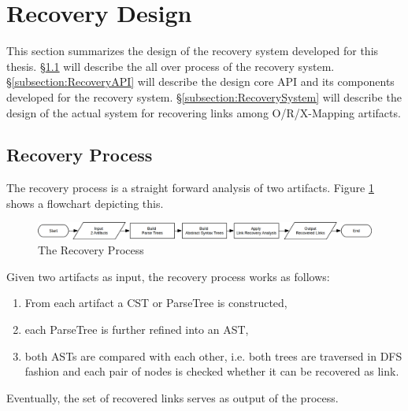 \section{Recovery Design}
\label{section:RecoverySystemDesign}
This section summarizes the design of the recovery system developed for this thesis.
§\ref{subsection:RecoveryProcess} will describe the all over process of the recovery system.
§\ref{subsection:RecoveryAPI} will describe the design core \gls{API} and its components developed for the recovery system.
§\ref{subsection:RecoverySystem} will describe the design of the actual system for recovering links among \gls{O/R/X-Mapping} artifacts.


\subsection{Recovery Process}
\label{subsection:RecoveryProcess}
The recovery process is a straight forward analysis of two artifacts.
Figure \ref{figure:RecovryProcess} shows a flowchart depicting this.
\begin{figure}[h!]
\begin{center}
\includegraphics[width=\textwidth]{images/RecoveryProcess.png}
\end{center}
\caption{The Recovery Process}
\label{figure:RecovryProcess}
\end{figure}
Given two artifacts as input, the recovery process works as follows:
\begin{enumerate}
\item
From each artifact a \gls{CST} or \gls{ParseTree} is constructed,
\item
each \gls{ParseTree} is further refined into an \gls{AST},
\item
both \glspl{AST} are compared with each other, i.e. both trees are traversed in \gls{DFS} fashion and each pair of nodes is checked whether it can be recovered as link.
\end{enumerate}
Eventually, the set of recovered links serves as output of the process.

